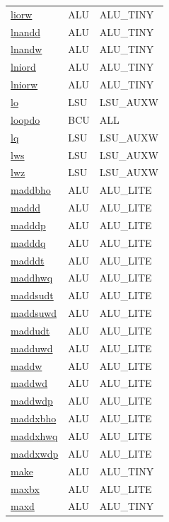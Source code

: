 \begin{small}
\begin{longtable}[l]{l l l}
\hyperlink{lvx.liorw}{liorw} & ALU & ALU\_TINY \\ 
\hyperlink{lvx.lnandd}{lnandd} & ALU & ALU\_TINY \\ 
\hyperlink{lvx.lnandw}{lnandw} & ALU & ALU\_TINY \\ 
\hyperlink{lvx.lniord}{lniord} & ALU & ALU\_TINY \\ 
\hyperlink{lvx.lniorw}{lniorw} & ALU & ALU\_TINY \\ 
\hyperlink{lvx.lo}{lo} & LSU & LSU\_AUXW \\ 
\hyperlink{lvx.loopdo}{loopdo} & BCU & ALL \\ 
\hyperlink{lvx.lq}{lq} & LSU & LSU\_AUXW \\ 
\hyperlink{lvx.lws}{lws} & LSU & LSU\_AUXW \\ 
\hyperlink{lvx.lwz}{lwz} & LSU & LSU\_AUXW \\ 
\hyperlink{lvx.maddbho}{maddbho} & ALU & ALU\_LITE \\ 
\hyperlink{lvx.maddd}{maddd} & ALU & ALU\_LITE \\ 
\hyperlink{lvx.madddp}{madddp} & ALU & ALU\_LITE \\ 
\hyperlink{lvx.madddq}{madddq} & ALU & ALU\_LITE \\ 
\hyperlink{lvx.madddt}{madddt} & ALU & ALU\_LITE \\ 
\hyperlink{lvx.maddhwq}{maddhwq} & ALU & ALU\_LITE \\ 
\hyperlink{lvx.maddsudt}{maddsudt} & ALU & ALU\_LITE \\ 
\hyperlink{lvx.maddsuwd}{maddsuwd} & ALU & ALU\_LITE \\ 
\hyperlink{lvx.maddudt}{maddudt} & ALU & ALU\_LITE \\ 
\hyperlink{lvx.madduwd}{madduwd} & ALU & ALU\_LITE \\ 
\hyperlink{lvx.maddw}{maddw} & ALU & ALU\_LITE \\ 
\hyperlink{lvx.maddwd}{maddwd} & ALU & ALU\_LITE \\ 
\hyperlink{lvx.maddwdp}{maddwdp} & ALU & ALU\_LITE \\ 
\hyperlink{lvx.maddxbho}{maddxbho} & ALU & ALU\_LITE \\ 
\hyperlink{lvx.maddxhwq}{maddxhwq} & ALU & ALU\_LITE \\ 
\hyperlink{lvx.maddxwdp}{maddxwdp} & ALU & ALU\_LITE \\ 
\hyperlink{lvx.make}{make} & ALU & ALU\_TINY \\ 
\hyperlink{lvx.maxbx}{maxbx} & ALU & ALU\_LITE \\ 
\hyperlink{lvx.maxd}{maxd} & ALU & ALU\_TINY \\ 

\end{longtable}
\end{small}
